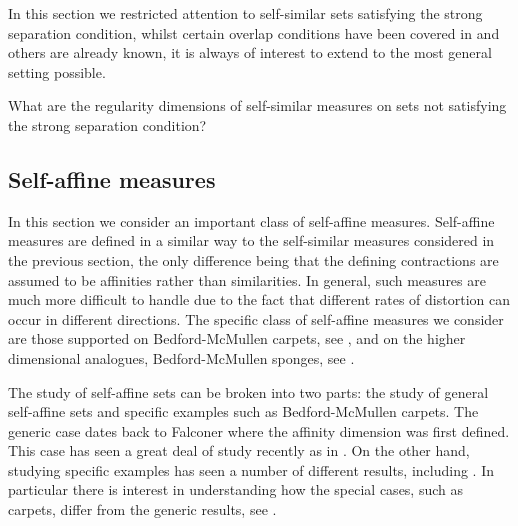 In this section we restricted attention to self-similar sets satisfying the strong separation condition, whilst certain overlap conditions have been covered in \cite{hare-hare-tros} and others are already known, it is always of interest to extend to the most general setting possible.
\begin{question}
What are the regularity dimensions of self-similar measures on sets not satisfying the strong separation condition?
\end{question}





\subsection{Self-affine measures}\label{ch-upper-reg:sec:self-affineresults}


In this section we consider an important class of self-affine measures.  Self-affine measures are defined in a similar way to the self-similar measures considered in the previous section, the only difference being that the defining contractions are assumed to be affinities rather than similarities.  In general, such measures are much more difficult to handle due to the fact that different rates of distortion can occur in different directions.  The specific class of self-affine measures we consider are those supported on Bedford-McMullen carpets, see \cite{bedford, mcmullen}, and on the higher dimensional analogues, Bedford-McMullen sponges, see \cite{kenyonperes, sponges}. 

The study of self-affine sets can be broken into two parts: the study of general self-affine sets and specific examples such as Bedford-McMullen carpets. The generic case dates back to Falconer \cite{falconer-affine} where the affinity dimension was first defined. This case has seen a great deal of study recently as in \cite{barany-hochman-rapaport,hochman-rapaport}. On the other hand, studying specific examples has seen a number of different results, including \cite{bedford,mcmullen, lalley-gatzouras, baranski, mackay, Fr}. In particular there is interest in understanding how the special cases, such as carpets, differ from the generic results, see \cite{jurga-morris, morris-sert}. 

